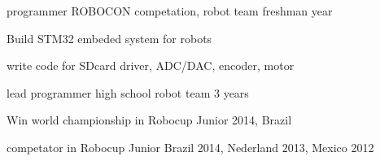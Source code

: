 \begin{cventries}
  \cventry
    {programmer} %
    {ROBOCON competation, robot team} %
    { } %
    {freshman year} %
    {
      \begin{cvitems} %
        \item {Build STM32 embeded system for robots}
        \item {write code for SDcard driver, ADC/DAC, encoder, motor}
      \end{cvitems}
    }

  \cventry
    {lead programmer} %
    {high school robot team} %
    { } %
    {3 years} %
    {
      \begin{cvitems} %
        \item {Win world championship in Robocup Junior 2014, Brazil}
        \item {competator in Robocup Junior Brazil 2014, Nederland 2013, Mexico 2012}
      \end{cvitems}
    }

\end{cventries}
